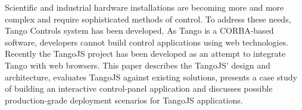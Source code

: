 
Scientific and industrial hardware installations are becoming more and more
complex and require sophisticated methods of control. To address these needs,
Tango Controls system has been developed. As Tango is a CORBA-based software,
developers cannot build control applications using web technologies.
Recently the TangoJS project has been developed as an attempt to integrate
Tango with web browsers. This paper describes the TangoJS' design and
architecture, evaluates TangoJS against existing solutions,
presents a case study of building an interactive control-panel application
and discusses possible production-grade deployment scenarios for TangoJS
applications.
